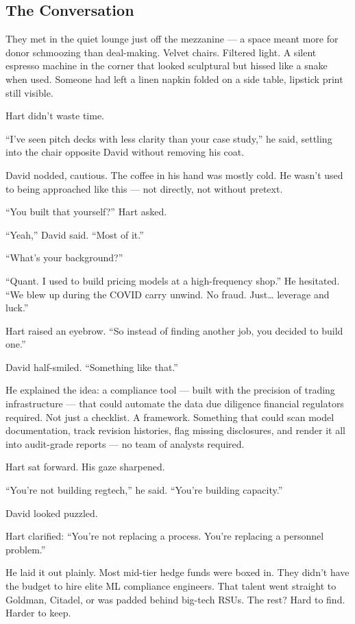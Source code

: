 \subsection{The Conversation}

They met in the quiet lounge just off the mezzanine — a space meant more for donor schmoozing than deal-making. 
Velvet chairs. Filtered light. A silent espresso machine in the corner that looked sculptural but hissed like a 
snake when used. Someone had left a linen napkin folded on a side table, lipstick print still visible.

Hart didn’t waste time.

“I’ve seen pitch decks with less clarity than your case study,” he said, settling into the chair opposite David 
without removing his coat.

David nodded, cautious. The coffee in his hand was mostly cold. He wasn’t used to being approached like this — 
not directly, not without pretext.

“You built that yourself?” Hart asked.

“Yeah,” David said. “Most of it.”

“What’s your background?”

“Quant. I used to build pricing models at a high-frequency shop.”  
He hesitated. “We blew up during the COVID carry unwind. No fraud. Just… leverage and luck.”

Hart raised an eyebrow. “So instead of finding another job, you decided to build one.”

David half-smiled. “Something like that.”

He explained the idea: a compliance tool — built with the precision of trading infrastructure — that could automate 
the data due diligence financial regulators required.  
Not just a checklist. A framework. Something that could scan model documentation, track revision histories, flag 
missing disclosures, and render it all into audit-grade reports — no team of analysts required.

Hart sat forward. His gaze sharpened.

“You’re not building regtech,” he said. “You’re building capacity.”

David looked puzzled.

Hart clarified: “You’re not replacing a process. You’re replacing a personnel problem.”

He laid it out plainly. Most mid-tier hedge funds were boxed in.  
They didn’t have the budget to hire elite ML compliance engineers. That talent went straight to Goldman, Citadel, 
or was padded behind big-tech RSUs. The rest? Hard to find. Harder to keep.

